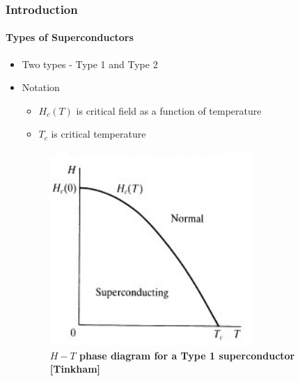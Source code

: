 \documentclass[12pt]{beamer}
\begin{document}
\begin{frame}
\frametitle{Introduction}
\framesubtitle{Types of Superconductors}


\begin{itemize}

  \item Two types - Type 1 and Type 2
  \pause
  \item Notation
  \pause
  \begin{itemize}
    \item \(H_c (T)\) is critical field as a function of temperature
    \pause
    \item \(T_c\) is critical temperature
  \end{itemize}
  \pause
  \begin{figure}[h]
    \includegraphics[scale = 0.5]{Type1.png}
    \caption{\textbf{\(H-T\) phase diagram for a Type 1 superconductor [Tinkham]}}
  \end{figure}
\end{itemize}


\end{frame}
\end{document}
